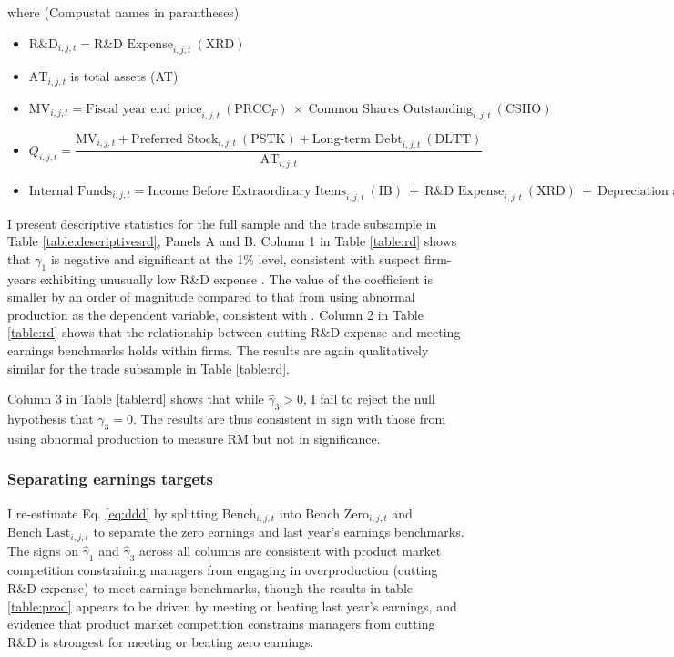 \documentclass[notitlepage, 12pt]{article}
\begin{document}
\noindent where (Compustat names in parantheses)
\begin{itemize}
\item $\text{R\&D}_{i,j,t} = \text{R\&D Expense}_{i,j,t} \ (\text{XRD})$
\item $\text{AT}_{i,j,t}$ is total assets (AT)
\item $\text{MV}_{i,j,t} = \text{Fiscal year end price}_{i,j,t} \ (\text{PRCC}_{F}) \ \times \ \text{Common Shares Outstanding}_{i,j,t} \ (\text{CSHO})$
\item $Q_{i,j,t} = \dfrac{\text{MV}_{i,j,t} + \text{Preferred Stock}_{i,j,t} \ (\text{PSTK}) + \text{Long-term Debt}_{i,j,t} \ (\text{DLTT})}{\text{AT}_{i,j,t}}$
\item $\text{Internal Funds}_{i,j,t} = \text{Income Before Extraordinary Items}_{i,j,t} \ (\text{IB}) \ + \ \text{R\&D Expense}_{i,j,t} \ (\text{XRD}) \ + \ \text{Depreciation and Amortization}_{i,j,t} \ (\text{DP})$
\end{itemize}

\noindent I present descriptive statistics for the full sample and the trade subsample in Table \ref{table:descriptivesrd}, Panels A and B. Column 1 in Table \ref{table:rd} shows that $\gamma_{1}$ is negative and significant at the 1\% level, consistent with suspect firm-years exhibiting unusually low R\&D expense \citep{roychowdhury:2006}. The value of the coefficient is smaller by an order of magnitude compared to that from using abnormal production as the dependent variable, consistent with \citet{gunny:2010}. Column 2 in Table \ref{table:rd} shows that the relationship between cutting R\&D expense and meeting earnings benchmarks holds within firms. The results are again qualitatively similar for the trade subsample in Table \ref{table:rd}.
\newline

\noindent Column 3 in Table \ref{table:rd} shows that while $\widehat{\gamma}_{3} > 0$, I fail to reject the null hypothesis that $\gamma_{3} = 0$. The results are thus consistent in sign with those from using abnormal production to measure RM but not in significance.

\subsubsection{Separating earnings targets}
I re-estimate Eq. \eqref{eq:ddd} by splitting $\text{Bench}_{i,j,t}$ into $\text{Bench Zero}_{i,j,t}$ and $\text{Bench Last}_{i,j,t}$ to separate the zero earnings and last year's earnings benchmarks. The signs on $\widehat{\gamma}_{1}$ and $\widehat{\gamma}_{3}$ across all columns are consistent with product market competition constraining managers from engaging in overproduction (cutting R\&D expense) to meet earnings benchmarks, though the results in table \ref{table:prod} appears to be driven by meeting or beating last year's earnings, and evidence that product market competition constrains managers from cutting R\&D is strongest for meeting or beating zero earnings.
\end{document}

